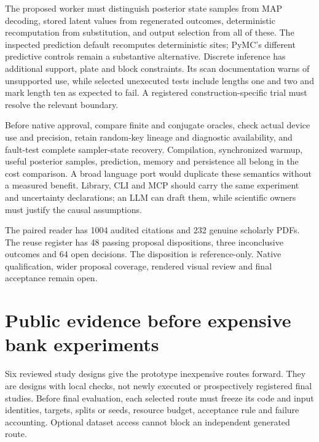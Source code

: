 The proposed worker must distinguish posterior state samples from MAP
decoding, stored latent values from regenerated outcomes, deterministic
recomputation from substitution, and output selection from all of these.
The inspected prediction default recomputes deterministic sites; PyMC's
different predictive controls remain a substantive alternative. Discrete
inference has additional support, plate and block constraints. Its scan
documentation warns of unsupported use, while selected unexecuted tests
include lengths one and two and mark length ten as expected to fail. A
registered construction-specific trial must resolve the relevant
boundary. \citep{exec23_numpyro_sources,exec23_pymc_sources}

Before native approval, compare finite and conjugate oracles, check
actual device use and precision, retain random-key lineage and
diagnostic availability, and fault-test complete sampler-state recovery.
Compilation, synchronized warmup, useful posterior samples, prediction,
memory and persistence all belong in the cost comparison. A broad
language port would duplicate these semantics without a measured
benefit. Library, CLI and MCP should carry the same experiment and
uncertainty declarations; an LLM can draft them, while scientific owners
must justify the causal assumptions.
\citep{exec23_numpyro_sources,exec23_numpyro_reference}

The paired reader has 1004 audited citations and 232 genuine scholarly
PDFs. The reuse register has 48 passing proposal dispositions, three
inconclusive outcomes and 64 open decisions. The disposition is
reference-only. Native qualification, wider proposal coverage, rendered
visual review and final acceptance remain open.
\citep{sp23numpyro_reader,sp23numpyro_progress}

\hypertarget{public-evidence-before-expensive-bank-experiments}{%
\section{Public evidence before expensive bank
experiments}\label{public-evidence-before-expensive-bank-experiments}}

Six reviewed study designs give the prototype inexpensive routes
forward. They are designs with local checks, not newly executed or
prospectively registered final studies. Before final evaluation, each
selected route must freeze its code and input identities, targets,
splits or seeds, resource budget, acceptance rule and failure
accounting. Optional dataset access cannot block an independent
generated route. \citep{sp13_public}

